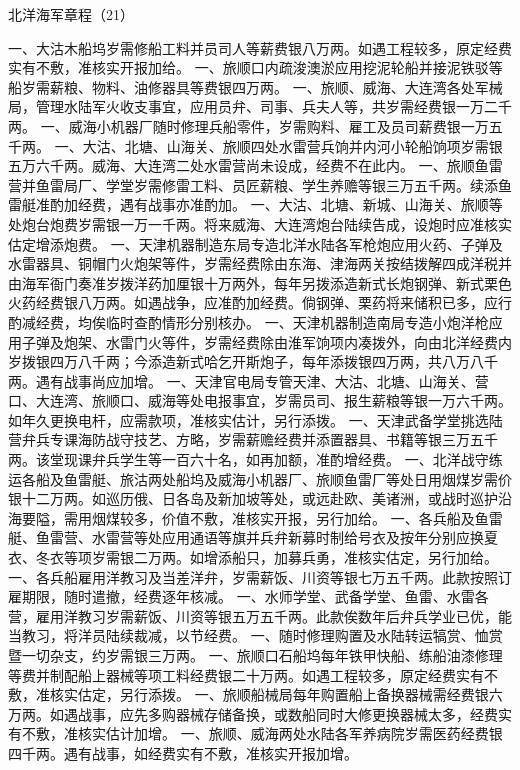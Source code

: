 \documentclass[12pt,UTF8]{ctexbook}
\begin{document}
北洋海军章程（21）

一、大沽木船坞岁需修船工料并员司人等薪费银八万两。如遇工程较多，原定经费实有不敷，准核实开报加给。
一、旅顺口内疏浚澳淤应用挖泥轮船并接泥铁驳等船岁需薪粮、物料、油修器具等费银四万两。
一、旅顺、威海、大连湾各处军械局，管理水陆军火收支事宜，应用员弁、司事、兵夫人等，共岁需经费银一万二千两。
一、威海小机器厂随时修理兵船零件，岁需购料、雇工及员司薪费银一万五千两。
一、大沽、北塘、山海关、旅顺四处水雷营兵饷并内河小轮船饷项岁需银五万六千两。威海、大连湾二处水雷营尚未设成，经费不在此内。
一、旅顺鱼雷营并鱼雷局厂、学堂岁需修雷工料、员匠薪粮、学生养赡等银三万五千两。续添鱼雷艇准酌加经费，遇有战事亦准酌加。
一、大沽、北塘、新城、山海关、旅顺等处炮台炮费岁需银一万一千两。将来威海、大连湾炮台陆续告成，设炮时应准核实估定增添炮费。
一、天津机器制造东局专造北洋水陆各军枪炮应用火药、子弹及水雷器具、铜帽门火炮架等件，岁需经费除由东海、津海两关按结拨解四成洋税并由海军衙门奏准岁拨洋药加厘银十万两外，每年另拨添造新式长炮钢弹、新式栗色火药经费银八万两。如遇战争，应准酌加经费。倘钢弹、栗药将来储积已多，应行酌减经费，均俟临时查酌情形分别核办。
一、天津机器制造南局专造小炮洋枪应用子弹及炮架、水雷门火等件，岁需经费除由淮军饷项内凑拨外，向由北洋经费内岁拨银四万八千两；今添造新式哈乞开斯炮子，每年添拨银四万两，共八万八千两。遇有战事尚应加增。
一、天津官电局专管天津、大沽、北塘、山海关、营口、大连湾、旅顺口、威海等处电报事宜，岁需员司、报生薪粮等银一万六千两。如年久更换电杆，应需款项，准核实估计，另行添拨。
一、天津武备学堂挑选陆营弁兵专课海防战守技艺、方略，岁需薪赡经费并添置器具、书籍等银三万五千两。该堂现课弁兵学生等一百六十名，如再加额，准酌增经费。
一、北洋战守练运各船及鱼雷艇、旅沽两处船坞及威海小机器厂、旅顺鱼雷厂等处日用烟煤岁需价银十二万两。如巡历俄、日各岛及新加坡等处，或远赴欧、美诸洲，或战时巡护沿海要隘，需用烟煤较多，价值不敷，准核实开报，另行加给。
一、各兵船及鱼雷艇、鱼雷营、水雷营等处应用通语等旗并兵弁新募时制给号衣及按年分别应换夏衣、冬衣等项岁需银二万两。如增添船只，加募兵勇，准核实估定，另行加给。
一、各兵船雇用洋教习及当差洋弁，岁需薪饭、川资等银七万五千两。此款按照订雇期限，随时遣撤，经费逐年核减。
一、水师学堂、武备学堂、鱼雷、水雷各营，雇用洋教习岁需薪饭、川资等银五万五千两。此款俟数年后弁兵学业已优，能当教习，将洋员陆续裁减，以节经费。
一、随时修理购置及水陆转运犒赏、恤赏暨一切杂支，约岁需银三万两。
一、旅顺口石船坞每年铁甲快船、练船油漆修理等费并制配船上器械等项工料经费银二十万两。如遇工程较多，原定经费实有不敷，准核实估定，另行添拨。
一、旅顺船械局每年购置船上备换器械需经费银六万两。如遇战事，应先多购器械存储备换，或数船同时大修更换器械太多，经费实有不敷，准核实估计加增。
一、旅顺、威海两处水陆各军养病院岁需医药经费银四千两。遇有战事，如经费实有不敷，准核实开报加增。
\end{document}
